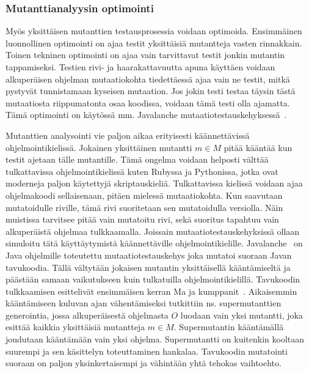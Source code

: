\documentclass{tktltiki}
\begin{document}
\subsubsection{Mutanttianalyysin optimointi}
Myös yksittäisen mutanttien testausprosessia voidaan optimoida. Ensimmäinen luonnollinen optimointi on ajaa testit yksittäisiä mutantteja vasten rinnakkain. Toinen tekninen optimointi on ajaa vain tarvittavat testit jonkin mutantin tappamiseksi. Testien rivi- ja haarakattavuutta apuna käyttäen voidaan alkuperäisen ohjelman mutaatiokohta tiedettäessä ajaa vain ne testit, mitkä pystyvät tunnistamaan kyseisen mutaation. Jos jokin testi testaa täysin tästä mutaatiosta riippumatonta osaa koodissa, voidaan tämä testi olla ajamatta. Tämä optimointi on käytössä mm. Javalanche mutaatiotestauskehyksessä~\cite{}.

Mutanttien analysointi vie paljon aikaa erityisesti käännettävissä ohjelmointikielissä. Jokainen yksittäinen mutantti $m\in M$ pitää kääntää kun testit ajetaan tälle mutantille. Tämä ongelma voidaan helposti välttää tulkattavissa ohjelmointikielissä kuten Rubyssa ja Pythonissa, jotka ovat moderneja paljon käytettyjä skriptauskieliä. Tulkattavissa kielissä voidaan ajaa ohjelmakoodi sellaisenaan, pitäen mielessä mutaatiokohta. Kun saavutaan mutatoidulle riville, tämä rivi suoritetaan sen mutatoidulla versiolla. Näin muistissa tarvitsee pitää vain mutatoitu rivi, sekä suoritus tapahtuu vain alkuperäistä ohjelmaa tulkkaamalla. Joissain mutaatiotestauskehyksissä ollaan simuloitu tätä käyttäytymistä käännettäville ohjelmointikielille. Javalanche~\cite{} on Java ohjelmille toteutettu mutaatiotestauskehys joka mutatoi suoraan Javan tavukoodia. Tällä vältytään jokaisen mutantin yksittäisellä kääntämiseltä ja päästään samaan vaikutukseen kuin tulkatuilla ohjelmointikielillä. Tavukoodin tulkkaamisen esittelivät ensimmäisen kerran Ma ja kumppanit~\cite{}. Aikaisemmin kääntämiseen kuluvan ajan vähentämiseksi tutkittiin ns. supermutanttien generointia, jossa alkuperäisestä ohjelmasta $O$ luodaan vain yksi mutantti, joka esittää kaikkia yksittäisiä mutantteja $m\in M$. Supermutantin kääntämällä joudutaan kääntämään vain yksi ohjelma. Supermutantti on kuitenkin kooltaan suurempi ja sen käsittelyn toteuttaminen hankalaa. Tavukoodin mutatointi suoraan on paljon yksinkertaisempi ja vähintään yhtä tehokas vaihtoehto.
\end{document}
